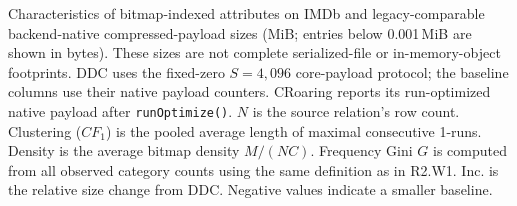 \documentclass[10pt]{article}
\begin{document}
\begin{table}[!ht]
  \centering
  \caption{Characteristics of bitmap-indexed attributes on IMDb and
  legacy-comparable backend-native compressed-payload sizes (MiB; entries below
  0.001\,MiB are shown in bytes). These sizes are not complete serialized-file
  or in-memory-object footprints. DDC uses the fixed-zero $S=4{,}096$
  core-payload protocol; the baseline columns use their native payload counters.
  CRoaring reports its run-optimized native payload after \texttt{runOptimize()}.
  $N$ is the source relation's row count. Clustering ($CF_1$) is the pooled
  average length of maximal consecutive 1-runs. Density is the average bitmap
  density $M/(NC)$. Frequency Gini $G$ is computed from all observed category
  counts using the same definition as in R2.W1. Inc. is the relative size change
  from DDC. Negative values indicate a smaller baseline.}
  \label{tab:job-size-cr-run}


\end{table}
\end{document}
